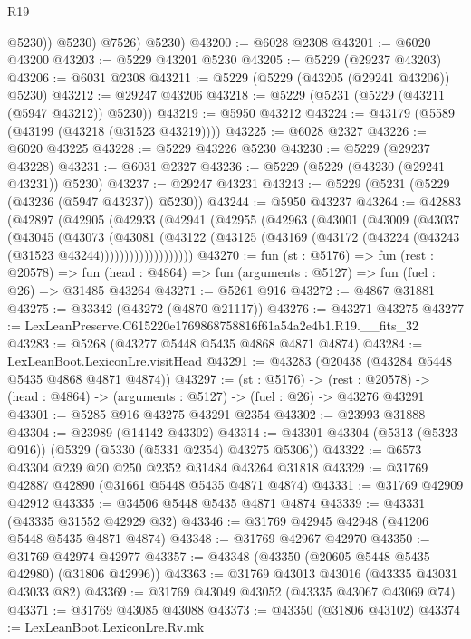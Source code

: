 \begin{lexlean}{R19}
\begin{coremodule}
              @5230))
          @5230)
        @7526)
      @5230)
@43200 := @6028 @2308
@43201 := @6020 @43200
@43203 := @5229 @43201 @5230
@43205 := @5229 (@29237 @43203)
@43206 := @6031 @2308
@43211 := @5229 (@5229 (@43205 (@29241 @43206)) @5230)
@43212 := @29247 @43206
@43218 := @5229 (@5231 (@5229 (@43211 (@5947 @43212)) @5230))
@43219 := @5950 @43212
@43224 := @43179 (@5589 (@43199 (@43218 (@31523 @43219))))
@43225 := @6028 @2327
@43226 := @6020 @43225
@43228 := @5229 @43226 @5230
@43230 := @5229 (@29237 @43228)
@43231 := @6031 @2327
@43236 := @5229 (@5229 (@43230 (@29241 @43231)) @5230)
@43237 := @29247 @43231
@43243 := @5229 (@5231 (@5229 (@43236 (@5947 @43237)) @5230))
@43244 := @5950 @43237
@43264 := @42883
    (@42897
      (@42905
        (@42933
          (@42941
            (@42955
              (@42963
                (@43001
                  (@43009
                    (@43037
                      (@43045
                        (@43073
                          (@43081
                            (@43122
                              (@43125
                                (@43169 (@43172 (@43224 (@43243 (@31523 @43244)))))))))))))))))))
@43270 := fun (st : @5176) =>
  fun (rest : @20578) =>
  fun (head : @4864) => fun (arguments : @5127) => fun (fuel : @26) => @31485 @43264
@43271 := @5261 @916
@43272 := @4867 @31881
@43275 := @33342 (@43272 (@4870 @21117))
@43276 := @43271 @43275
@43277 := LexLeanPreserve.C615220e1769868758816f61a54a2e4b1.R19.__fits_32
@43283 := @5268 (@43277 @5448 @5435 @4868 @4871 @4874)
@43284 := LexLeanBoot.LexiconLre.visitHead
@43291 := @43283 (@20438 (@43284 @5448 @5435 @4868 @4871 @4874))
@43297 := (st : @5176) ->
  (rest : @20578) -> (head : @4864) -> (arguments : @5127) -> (fuel : @26) -> @43276 @43291
@43301 := @5285 @916 @43275 @43291 @2354
@43302 := @23993 @31888
@43304 := @23989 (@14142 @43302)
@43314 := @43301 @43304 (@5313 (@5323 @916)) (@5329 (@5330 (@5331 @2354) @43275 @5306))
@43322 := @6573 @43304 @239 @20 @250 @2352 @31484 @43264 @31818
@43329 := @31769 @42887 @42890 (@31661 @5448 @5435 @4871 @4874)
@43331 := @31769 @42909 @42912
@43335 := @34506 @5448 @5435 @4871 @4874
@43339 := @43331 (@43335 @31552 @42929 @32)
@43346 := @31769 @42945 @42948 (@41206 @5448 @5435 @4871 @4874)
@43348 := @31769 @42967 @42970
@43350 := @31769 @42974 @42977
@43357 := @43348 (@43350 (@20605 @5448 @5435 @42980) (@31806 @42996))
@43363 := @31769 @43013 @43016 (@43335 @43031 @43033 @82)
@43369 := @31769 @43049 @43052 (@43335 @43067 @43069 @74)
@43371 := @31769 @43085 @43088
@43373 := @43350 (@31806 @43102)
@43374 := LexLeanBoot.LexiconLre.Rv.mk

\end{coremodule}
\end{lexlean}
